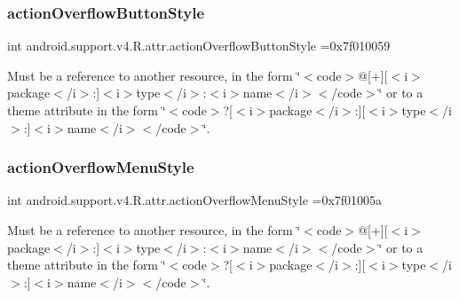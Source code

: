 \subsubsection{\texorpdfstring{action\+Overflow\+Button\+Style}{actionOverflowButtonStyle}}
{\footnotesize\ttfamily int android.\+support.\+v4.\+R.\+attr.\+action\+Overflow\+Button\+Style =0x7f010059\hspace{0.3cm}{\ttfamily [static]}}

Must be a reference to another resource, in the form \char`\"{}$<$code$>$@\mbox{[}+\mbox{]}\mbox{[}$<$i$>$package$<$/i$>$\+:\mbox{]}$<$i$>$type$<$/i$>$\+:$<$i$>$name$<$/i$>$$<$/code$>$\char`\"{} or to a theme attribute in the form \char`\"{}$<$code$>$?\mbox{[}$<$i$>$package$<$/i$>$\+:\mbox{]}\mbox{[}$<$i$>$type$<$/i$>$\+:\mbox{]}$<$i$>$name$<$/i$>$$<$/code$>$\char`\"{}. \mbox{\label{classandroid_1_1support_1_1v4_1_1R_1_1attr_adc55e21231727981af7f193f97233f39}} 
\subsubsection{\texorpdfstring{action\+Overflow\+Menu\+Style}{actionOverflowMenuStyle}}
{\footnotesize\ttfamily int android.\+support.\+v4.\+R.\+attr.\+action\+Overflow\+Menu\+Style =0x7f01005a\hspace{0.3cm}{\ttfamily [static]}}

Must be a reference to another resource, in the form \char`\"{}$<$code$>$@\mbox{[}+\mbox{]}\mbox{[}$<$i$>$package$<$/i$>$\+:\mbox{]}$<$i$>$type$<$/i$>$\+:$<$i$>$name$<$/i$>$$<$/code$>$\char`\"{} or to a theme attribute in the form \char`\"{}$<$code$>$?\mbox{[}$<$i$>$package$<$/i$>$\+:\mbox{]}\mbox{[}$<$i$>$type$<$/i$>$\+:\mbox{]}$<$i$>$name$<$/i$>$$<$/code$>$\char`\"{}. \mbox{\label{classandroid_1_1support_1_1v4_1_1R_1_1attr_a49f63fe97c5151a21fa424c599c51354}} 
